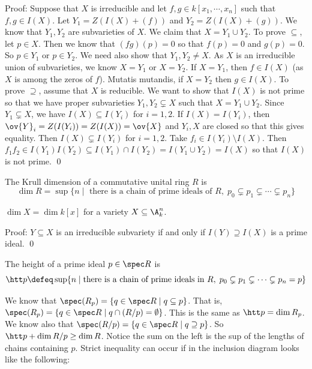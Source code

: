 \noindent Proof: Suppose that $X$ is irreducible and let $f,g \in k[x_1,\cdots,x_n]$ such that $f,g \in I(X)$. Let $Y_1=Z(I(X)+(f))$ and $Y_2=Z(I(X)+(g))$. We know that $Y_1,Y_2$ are subvarieties of $X$. We claim that $X=Y_1 \cup Y_2$. To prove $\subseteq$, let $p \in X$. Then we know that $(fg)(p)=0$ so that $f(p)=0$ and $g(p)=0$. So $p \in Y_1$ or $p \in Y_2$. We need also show that $Y_1,Y_2 \neq X$. As $X$ is an irreducible union of subvarieties, we know $X=Y_1$ or $X=Y_2$. If $X=Y_1$, then $f \in I(X)$ (as $X$ is among the zeros of $f$). Mutatis mutandis, if $X=Y_2$ then $g \in I(X)$. To prove $\supseteq$, assume that $X$ is reducible. We want to show that $I(X)$ is not prime so that we have proper subvarieties $Y_1,Y_2 \subsetneq X$ such that $X=Y_1 \cup Y_2$. Since $Y_1 \subsetneq X$, we have $I(X) \subseteq I(Y_i)$ for $i=1,2$. If $I(X)=I(Y_i)$, then $\ov{Y}_i=Z(I(Y_i))=Z(I(X))=\ov{X}$ and $Y_i,X$ are closed so that this gives equality. Then $I(X) \subsetneq I(Y_i)$ for $i=1,2$. Take $f_i \in I(Y_i) \setminus I(X)$. Then $f_1f_2 \in I(Y_1)I(Y_2) \subseteq I(Y_1) \cap I(Y_2)=I(Y_1 \cup Y_2)=I(X)$ so that $I(X)$ is not prime. \qed \\

\begin{dfn}
The Krull dimension of a commutative unital ring $R$ is
\[
\dim R=\sup\{n\;|\; \text{ there is a chain of prime ideals of } R, \; p_0 \subsetneq p_1\subsetneq \cdots \subsetneq p_n\}
\]
\end{dfn}

\begin{cor}
$\dim X=\dim k[x]$ for a variety $X \subseteq \A_k^n$.
\end{cor}

\noindent Proof: $Y \subseteq X$ is an irreducible subvariety if and only if $I(Y) \supseteq I(X)$ is a prime ideal. \qed \\

\begin{dfn}[Height]
The height of a prime ideal $p \in \spec R$ is
\[
\htt p \defeq \sup \{n\;|\; \text{there is a chain of prime ideals in }R, \; p_0 \subsetneq p_1 \subsetneq \cdots \subsetneq p_n=p\}
\]
\end{dfn}

We know that $\spec(R_p)=\{q \in \spec R\;|\; q \subseteq p\}$. That is, $\spec(R_p)=\{q \in \spec R\;|\; q \cap (R/p) = \emptyset\}$. This is the same as $\htt p=\dim R_p$. We know also that $\spec(R/p)=\{q \in \spec R\;|\; q \supseteq p\}$. So $\htt p+\dim R/p \geq \dim R$. Notice the sum on the left is the sup of the lengths of chains containing $p$. Strict inequality can occur if in the inclusion diagram looks like the following:

